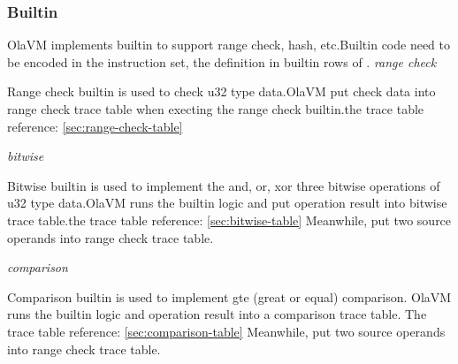 \subsubsection{Builtin}\label{subsec: instructions-builtin}
OlaVM implements builtin to support range check, hash, etc.Builtin code need to be encoded in the instruction set, the definition in builtin rows of .
\emph{range check}

Range check builtin is used to check u32 type data.OlaVM put check data into range check trace table when execting the range check builtin.the trace table reference: \ref{sec:range-check-table}

\emph{bitwise}

Bitwise builtin is used to implement the and, or, xor three bitwise operations of u32 type data.OlaVM runs the builtin logic and put operation result into bitwise trace table.the trace table reference: \ref{sec:bitwise-table}
Meanwhile, put two source operands into range check trace table.

\emph{comparison}

Comparison builtin is used to implement gte (great or equal) comparison. OlaVM runs the builtin logic and operation result into a comparison trace table. The trace table reference: \ref{sec:comparison-table}
Meanwhile, put two source operands into range check trace table.
